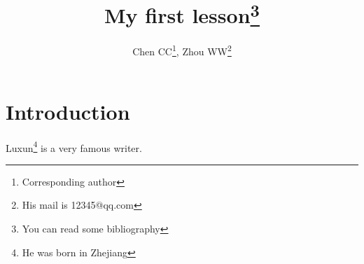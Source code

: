 \documentclass[12pt]{article}
\begin{document}
\title{My first lesson\footnote{You can read some bibliography}}
\author{Chen CC\footnote{Corresponding author}, Zhou WW\footnote{His mail is 12345@qq.com}}
\maketitle

\section{Introduction}
Luxun\footnote[5]{He was born in Zhejiang} is a very famous writer.
\end{document}
